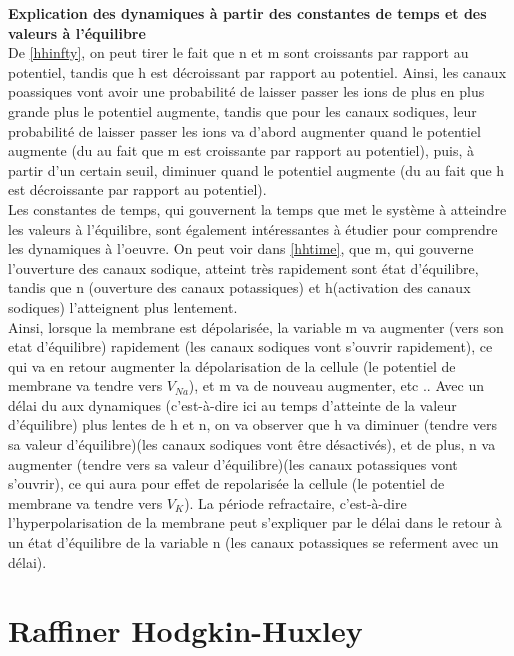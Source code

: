 \documentclass[12pt]{scrartcl}
\begin{document}
\clearpage
\textbf{Explication des dynamiques à partir des constantes de temps et des valeurs à l'équilibre}\\
De \ref{hhinfty}, on peut tirer le fait que n et m sont croissants par rapport au potentiel, tandis que h est décroissant par rapport au potentiel. Ainsi, les canaux poassiques vont avoir une probabilité de laisser passer les ions de plus en plus grande plus le potentiel augmente, tandis que pour les canaux sodiques, leur probabilité de laisser passer les ions va d'abord augmenter quand le potentiel augmente (du au fait que m est croissante par rapport au potentiel), puis, à partir d'un certain seuil, diminuer quand le potentiel augmente (du  au fait que h est décroissante par rapport au potentiel).\\
Les constantes de temps, qui gouvernent la temps que met le système à atteindre les valeurs à l'équilibre, sont également intéressantes à étudier pour comprendre les dynamiques à l'oeuvre. On peut voir dans \ref{hhtime}, que m, qui gouverne l'ouverture des canaux sodique, atteint très rapidement sont état d'équilibre, tandis que n (ouverture des canaux potassiques) et h(activation des canaux sodiques) l'atteignent plus lentement.\\
Ainsi, lorsque la membrane est dépolarisée, la variable m va augmenter (vers son etat d'équilibre) rapidement (les canaux sodiques vont s'ouvrir rapidement), ce qui va en retour augmenter la dépolarisation de la cellule (le potentiel de membrane va tendre vers $V_{Na}$), et m va de nouveau augmenter, etc .. Avec un délai du aux dynamiques (c'est-à-dire ici au temps d'atteinte de la valeur d'équilibre) plus lentes de h et n, on va observer que h va diminuer (tendre vers sa valeur d'équilibre)(les canaux sodiques vont être désactivés), et de plus, n va augmenter (tendre vers sa valeur d'équilibre)(les canaux potassiques vont s'ouvrir), ce qui aura pour effet de repolarisée la cellule (le potentiel de membrane va tendre vers $V_{K}$). La période refractaire, c'est-à-dire l'hyperpolarisation de la membrane peut s'expliquer par le délai dans le retour à un état d'équilibre de la variable n (les canaux potassiques se referment avec un délai).


\section{Raffiner Hodgkin-Huxley}
\end{document}

